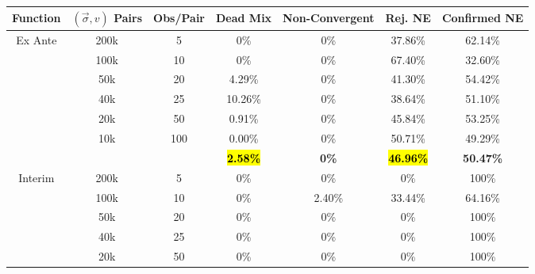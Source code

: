 \begin{table}[ht]
\begin{tabular}{c|c|c|c|c|c|c}
\multicolumn{1}{c}{Function}   & $(\vec{\sigma}, v)$ Pairs & Obs/Pair             & Dead Mix   & Non-Convergent & Rej. NE      & Confirmed NE     \\
\hline 
\multicolumn{1}{c}{Ex Ante}    & 200k                      & 5                    & 0\%             & 0\%              & 37.86\%          & 62.14\%          \\
                               & 100k                      & 10                   & 0\%             & 0\%              & 67.40\%          & 32.60\%          \\
                               & 50k                       & 20                   & 4.29\%          & 0\%              & 41.30\%          & 54.42\%          \\
                               & 40k                       & 25                   & 10.26\%         & 0\%              & 38.64\%          & 51.10\%          \\
                               & 20k                       & 50                   & 0.91\%          & 0\%              & 45.84\%          & 53.25\%          \\
                               & 10k                       & 100                  & 0.00\%          & 0\%              & 50.71\%          & 49.29\%          \\
\hline
                               & \multicolumn{1}{l}{}      & \multicolumn{1}{l}{} & \hl{\textbf{2.58\%}} & \textbf{0\%}     & \hl{\textbf{46.96\%}} & \textbf{50.47\%} \\
\hline
\multicolumn{1}{c}{Interim} & 200k                      & 5                    & 0\%             & 0\%              & 0\%              & 100\%            \\
                               & 100k                      & 10                   & 0\%             & 2.40\%           & 33.44\%          & 64.16\%          \\
                               & 50k                       & 20                   & 0\%             & 0\%              & 0\%              & 100\%            \\
                               & 40k                       & 25                   & 0\%             & 0\%              & 0\%              & 100\%            \\
                               & 20k                       & 50                   & 0\%             & 0\%              & 0\%              & 100\%            \\

\end{tabular}
\end{table}

